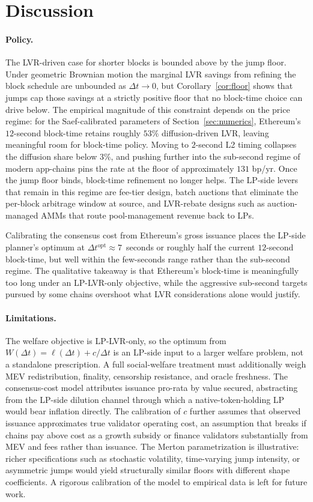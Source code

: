\documentclass[runningheads]{llncs}
\newcommand{\dt}{\Delta t}
\newcommand{\1}{\mathbf{1}}
\begin{document}
\section{Discussion}\label{sec:disc}

\paragraph{Policy.}
The LVR-driven case for shorter blocks is bounded above by the jump floor. Under geometric Brownian motion the marginal LVR savings from refining the block schedule are unbounded as $\dt \to 0$, but Corollary~\ref{cor:floor} shows that jumps cap those savings at a strictly positive floor that no block-time choice can drive below. The empirical magnitude of this constraint depends on the price regime: for the Saef-calibrated parameters of Section~\ref{sec:numerics}, Ethereum's $12$-second block-time retains roughly $53\%$ diffusion-driven LVR, leaving meaningful room for block-time policy. Moving to $2$-second L2 timing collapses the diffusion share below $3\%$, and pushing further into the sub-second regime of modern app-chains pins the rate at the floor of approximately $131$ bp/yr. Once the jump floor binds, block-time refinement no longer helps. The LP-side levers that remain in this regime are fee-tier design, batch auctions that eliminate the per-block arbitrage window at source, and LVR-rebate designs such as auction-managed AMMs that route pool-management revenue back to LPs.

Calibrating the consensus cost from Ethereum's gross issuance places the LP-side planner's optimum at $\dt^{\mathrm{opt}} \approx 7$~seconds or roughly half the current $12$-second block-time, but well within the few-seconds range rather than the sub-second regime. The qualitative takeaway is that Ethereum's block-time is meaningfully too long under an LP-LVR-only objective, while the aggressive sub-second targets pursued by some chains overshoot what LVR considerations alone would justify.

\paragraph{Limitations.}
The welfare objective is LP-LVR-only, so the optimum from $W(\dt) = \ell(\dt) + c/\dt$ is an LP-side input to a larger welfare problem, not a standalone prescription. A full social-welfare treatment must additionally weigh MEV redistribution, finality, censorship resistance, and oracle freshness. The consensus-cost model attributes issuance pro-rata by value secured, abstracting from the LP-side dilution channel through which a native-token-holding LP would bear inflation directly. The calibration of $c$ further assumes that observed issuance approximates true validator operating cost, an assumption that breaks if chains pay above cost as a growth subsidy or finance validators substantially from MEV and fees rather than issuance. The Merton parametrization is illustrative: richer specifications such as stochastic volatility, time-varying jump intensity, or asymmetric jumps would yield structurally similar floors with different shape coefficients. A rigorous calibration of the model to empirical data is left for future work.
\end{document}
